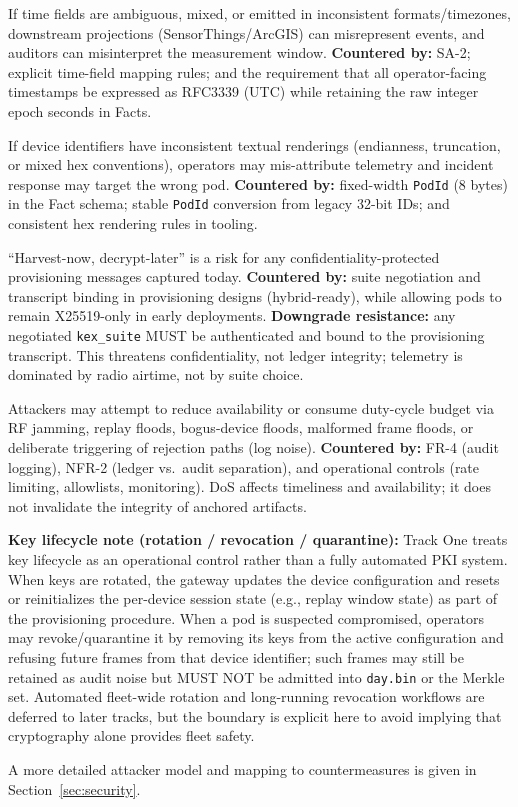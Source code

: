 \begin{description}[style=nextline]
  \item[T-7 Time semantic confusion (phenomenon vs. ingest/result time)] If time fields are ambiguous, mixed, or emitted in inconsistent formats/timezones, downstream projections (SensorThings/Arc\ac{GIS}) can misrepresent events, and auditors can misinterpret the measurement window.
  \textbf{Countered by:} SA-2; explicit time-field mapping rules; and the requirement that all operator-facing timestamps be expressed as \ac{RFC}3339 (\ac{UTC}) while retaining the raw integer epoch seconds in Facts.

  \item[T-8 Identifier ambiguity (PodId formatting)] If device identifiers have inconsistent textual renderings (endianness, truncation, or mixed hex conventions), operators may mis-attribute telemetry and incident response may target the wrong pod.
  \textbf{Countered by:} fixed-width \texttt{PodId} (8 bytes) in the Fact schema; stable \texttt{PodId} conversion from legacy 32-bit IDs; and consistent hex rendering rules in tooling.

  \item[T-9 Crypto agility] ``Harvest-now, decrypt-later'' is a risk for any confidentiality-protected
  provisioning messages captured today.
  \textbf{Countered by:} suite negotiation and transcript binding in provisioning designs (hybrid-ready), while allowing pods to remain X25519-only in early deployments. \textbf{Downgrade resistance:} any negotiated \texttt{kex\_suite} MUST be authenticated and bound to the provisioning transcript.
  This threatens confidentiality, not ledger integrity; telemetry is dominated by radio airtime, not by suite choice.

  \item[T-10 Denial-of-service and resource exhaustion] Attackers may attempt to reduce availability or consume duty-cycle budget via RF jamming, replay floods, bogus-device floods, malformed frame floods, or deliberate triggering of rejection paths (log noise).
  \textbf{Countered by:} FR-4 (audit logging), NFR-2 (ledger vs.\ audit separation), and operational controls (rate limiting, allowlists, monitoring).
  DoS affects timeliness and availability; it does not invalidate the integrity of anchored artifacts.
\end{description}

\textbf{Key lifecycle note (rotation / revocation / quarantine):}
Track One treats key lifecycle as an operational control rather than a fully automated \ac{PKI} system.
When keys are rotated, the gateway updates the device configuration and resets or reinitializes the per-device session state (e.g., replay window state) as part of the provisioning procedure.
When a pod is suspected compromised, operators may revoke/quarantine it by removing its keys from the active configuration and refusing future frames from that device identifier; such frames may still be retained as audit noise but MUST NOT be admitted into \texttt{day.bin} or the Merkle set.
Automated fleet-wide rotation and long-running revocation workflows are deferred to later tracks, but the boundary is explicit here to avoid implying that cryptography alone provides fleet safety.

A more detailed attacker model and mapping to countermeasures is given in Section~\ref{sec:security}.
